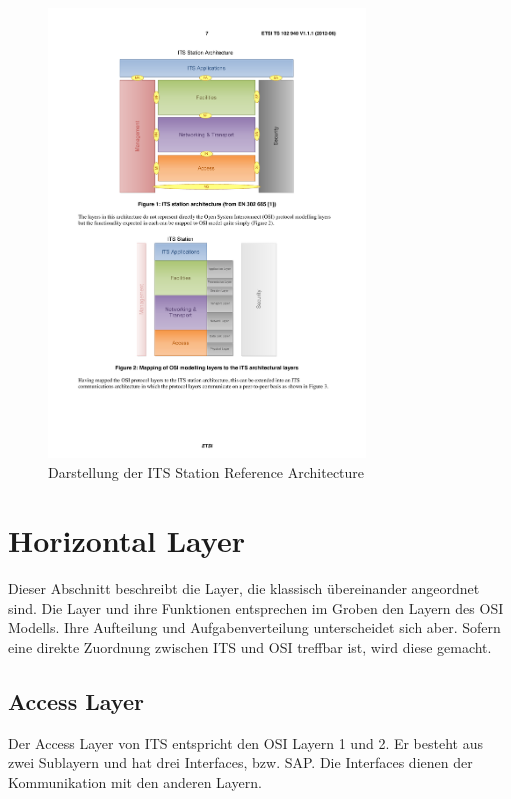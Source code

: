 \begin{figure}
	\includegraphics[width=0.75\textwidth]{content/images/02_architektur/stationReferenceArchitecture.pdf}
	\caption{Darstellung der ITS Station Reference Architecture \cite{ts102940}}
	\label{fig:funktionsweise_referenceArchitecture}
\end{figure}

\section{Horizontal Layer \label{architektur_horzontalLayer}}
Dieser Abschnitt beschreibt die Layer, die klassisch übereinander angeordnet sind. Die Layer und ihre Funktionen entsprechen im Groben den Layern des \ac{OSI} Modells. Ihre Aufteilung und Aufgabenverteilung unterscheidet sich aber. Sofern eine direkte Zuordnung zwischen \ac{ITS} und \ac{OSI} treffbar ist, wird diese gemacht.

\subsection{Access Layer}
Der Access Layer von ITS entspricht den \ac{OSI} Layern 1 und 2. Er besteht aus zwei Sublayern und hat drei Interfaces, bzw. \ac{SAP}. Die Interfaces dienen der Kommunikation mit den anderen Layern.

